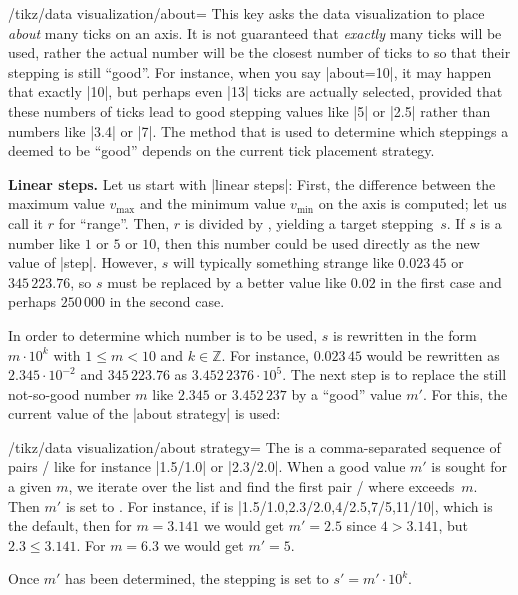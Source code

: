 \begin{key}{/tikz/data visualization/about=}
    This key asks the data visualization to place \emph{about} 
    many ticks on an axis. It is not guaranteed that \emph{exactly}
     many ticks will be used, rather the actual number will be the
    closest number of ticks to  so that their stepping is still
    ``good''. For instance, when you say |about=10|, it may happen that exactly
    |10|, but perhaps even |13| ticks are actually selected, provided that
    these numbers of ticks lead to good stepping values like |5| or |2.5|
    rather than numbers like |3.4| or |7|. The method that is used to determine
    which steppings a deemed to be ``good'' depends on the current tick
    placement strategy.


    \medskip
    \textbf{Linear steps.}
    Let us start with |linear steps|: First, the difference between the maximum
    value $v_{\max}$ and the minimum value $v_{\min}$ on the axis is computed;
    let us call it $r$ for ``range''. Then, $r$ is divided by ,
    yielding a target stepping~$s$. If $s$ is a number like $1$ or $5$ or $10$,
    then this number could be used directly as the new value of |step|.
    However, $s$ will typically something strange like $0.023\,45$ or
    $345\,223.76$, so $s$ must be replaced by a better value like $0.02$ in the
    first case and perhaps $250\,000$ in the second case.

    In order to determine which number is to be used, $s$ is rewritten in the
    form $m \cdot 10^k$ with $1 \le m < 10$ and $k \in \mathbb Z$. For
    instance, $0.023\,45$ would be rewritten as $2.345 \cdot 10^{-2}$ and
    $345\,223.76$ as $3.452\,2376 \cdot 10^5$. The next step is to replace the
    still not-so-good number $m$ like $2.345$ or $3.452\,237$ by a ``good''
    value $m'$. For this, the current value of the |about strategy| is used:
    \begin{key}{/tikz/data visualization/about strategy=}
        The  is a comma-separated sequence of pairs
        / like for instance |1.5/1.0| or |2.3/2.0|.
        When a good value $m'$ is sought for a given $m$, we iterate over the
        list and find the first pair / where
         exceeds~$m$. Then $m'$ is set to . For
        instance, if  is |1.5/1.0,2.3/2.0,4/2.5,7/5,11/10|, which is
        the default, then for $m=3.141$ we would get $m'=2.5$ since $4 >
        3.141$, but $2.3 \le 3.141$. For $m=6.3$ we would get $m'=5$.
    \end{key}
    Once $m'$ has been determined, the stepping is set to $s' = m' \cdot 10^k$.


\end{key}
